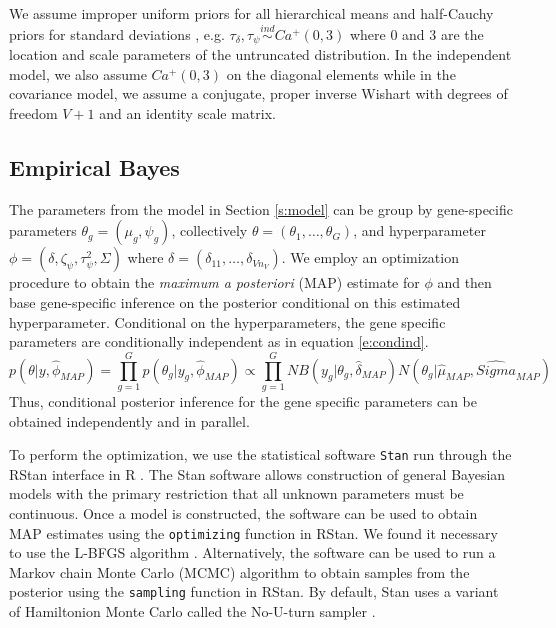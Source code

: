 \documentclass[useAMS,usenatbib,referee]{biom}
\begin{document}
We assume improper uniform priors for all hierarchical means and half-Cauchy priors for standard deviations \citep{gelman2006prior}, e.g. $\tau_\delta, \tau_\psi \stackrel{ind}{\sim} Ca^+(0,3)$ where 0 and 3 are the location and scale parameters of the untruncated distribution. In the independent model, we also assume $Ca^+(0,3)$ on the diagonal elements while in the covariance model, we assume a conjugate, proper inverse Wishart with degrees of freedom $V+1$ and an identity scale matrix. 

\subsection{Empirical Bayes}
\label{s:ebayes}

The parameters from the model in Section \ref{s:model} can be group by gene-specific parameters $\theta_g = (\mu_g,\psi_g)$, collectively $\theta = (\theta_1,\ldots,\theta_G)$, and hyperparameter $\phi = (\delta, \zeta_\psi, \tau_\psi^2, \Sigma)$ where $\delta = (\delta_{11},\ldots,\delta_{Vn_V})$. We employ an optimization procedure to obtain the \emph{maximum a posteriori} (MAP) estimate for $\phi$ and then base gene-specific inference on the posterior conditional on this estimated hyperparameter. Conditional on the hyperparameters, the gene specific parameters are conditionally independent as in equation \eqref{e:condind}. 
\begin{equation}
p(\theta|y,\hat{\phi}_{MAP}) = \prod_{g=1}^G p(\theta_g|y_g,\hat{\phi}_{MAP}) \propto \prod_{g=1}^G NB(y_g|\theta_g,\hat{\delta}_{MAP})N(\theta_g|\hat{\mu}_{MAP}, \hat{Sigma}_{MAP}) 
\label{e:condind}
\end{equation}
Thus, conditional posterior inference for the gene specific parameters can be obtained independently and in parallel.

To perform the optimization, we use the statistical software {\tt Stan} \citep{stan-software:2014} run through the RStan interface \citep{rstan-software:2014} in R \citep{R2014}. The Stan software allows construction of general Bayesian models with the primary restriction that all unknown parameters must be continuous. Once a model is constructed, the software can be used to obtain MAP estimates \cite[see Section 50.3]{stan-manual:2014} using the {\tt optimizing} function in RStan. We found it necessary to use the L-BFGS algorithm \cite[see Section 55]{stan-manual:2014}. Alternatively, the software can be used to run a Markov chain Monte Carlo (MCMC) algorithm to obtain samples from the posterior using the {\tt sampling} function in RStan. By default, Stan uses a variant of Hamiltonion Monte Carlo \citep{neal2011mcmc} called the No-U-turn sampler \citep{hoffman2013no}. 
\end{document}
